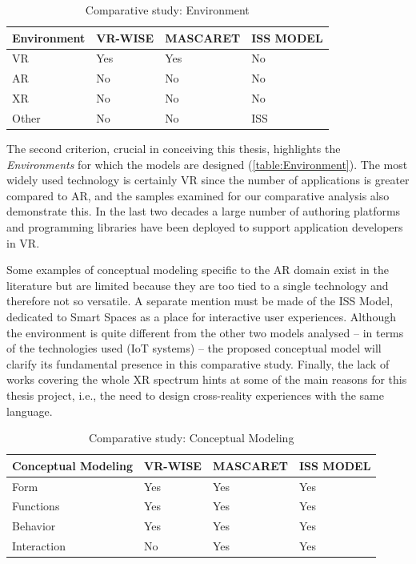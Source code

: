 \begin{table}
\begin{tabular}{|p{2.75cm}|p{3cm}|p{3cm}|p{3cm}|} 
\hline %
\textbf{Environment}
& \textbf{VR-WISE} 
& \textbf{MASCARET}
& \textbf{ISS MODEL} \\ 
\hline
VR
& Yes
& Yes
& No\\ 
\hline
AR
& No
& No
& No\\ 
\hline
XR
& No
& No
& No\\ 
\hline
Other
& No
& No
& ISS\\ 
\hline
\end{tabular} 
\caption{Comparative study: Environment}
\label{table:Environment}
\end{table}

The second criterion, crucial in conceiving this thesis, highlights the \textit{Environments} for which the models are designed (\autoref{table:Environment}). The most widely used technology is certainly VR since the number of applications is greater compared to AR, and the samples examined for our comparative analysis also demonstrate this. 
In the last two decades a large number of authoring platforms and programming libraries have been deployed to support application developers in VR. 

Some examples of conceptual modeling specific to the AR domain exist in the literature but are limited because they are too tied to a single technology and therefore not so versatile. A separate mention must be made of the ISS Model, dedicated to Smart Spaces as a place for interactive user experiences. Although the environment is quite different from the other two models analysed -- in terms of the technologies used (IoT systems) -- the proposed conceptual model will clarify its fundamental presence in this comparative study. 
Finally, the lack of works covering the whole XR spectrum hints at some of the main reasons for this thesis project, i.e., the need to design cross-reality experiences with the same language.

\begin{table}
\begin{tabular}{|p{2.5cm}|p{3cm}|p{3cm}|p{3cm}|} 
\hline %
\textbf{Conceptual Modeling} 
& \textbf{VR-WISE} 
& \textbf{MASCARET}
& \textbf{ISS MODEL} \\ 
\hline
Form
& Yes
& Yes
& Yes\\ 
\hline
Functions
& Yes
& Yes
& Yes\\ 
\hline
Behavior
& Yes
& Yes
& Yes\\ 
\hline
Interaction
& No
& Yes
& Yes\\ 
\hline
\end{tabular} 
\caption{Comparative study: Conceptual Modeling}
\label{table:Conceptual Modeling}
\end{table}

